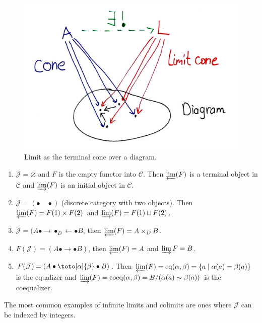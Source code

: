 \documentclass[english,letterpaper]{article}%
\numberwithin{equation}{section}
\numberwithin{figure}{section}
\numberwithin{table}{section}
\theoremstyle{definition}
\theoremstyle{definition}
\theoremstyle{definition}
\theoremstyle{plain}
\theoremstyle{plain}
\theoremstyle{plain}
\theoremstyle{plain}
\theoremstyle{remark}
\theoremstyle{remark}
\newcommand{\calC}{\mathcal{C}}
\newcommand{\calJ}{\mathcal{J}}
\newcommand{\colimit}{\varinjlim}
\newcommand{\limit}{\varprojlim}
\begin{document}
\begin{figure}[b]
    \centering
    \includegraphics[scale=0.15]{Images/limits.png}
    \caption{Limit as the terminal cone over a diagram.}
    \label{fig:limits}
\end{figure}
    
\begin{example}
\begin{enumerate}
    \item $\calJ=\varnothing$ and $F$ is the empty functor into $\calC$. Then $\limit(F)$ is a terminal object in $\calC$ and $\colimit(F)$ is an initial object in $\calC$.
    \item $\calJ=(\bullet\quad\bullet)$ (discrete category with two objects). Then $\limit(F)=F(1)\times F(2)$ and $\colimit(F)=F(1)\sqcup F(2)$.
    \item $\calJ=(A\bullet\to \bullet_D\longleftarrow \bullet B$, then $\limit(F)=A\times_D B$.
    \item $F(\calJ)=(A\bullet\to \bullet B)$, then $\limit(F)=A$ and $\colimit{F}=B$.
    \item $F(\calJ)=(A\bullet\toto[\alpha]{\beta}\bullet B)$. Then $\limit(F)=\mathrm{eq}(\alpha,\beta)=\{a\mid \alpha(a)=\beta(a)\}$ is the equalizer and $\colimit(F)=\mathrm{coeq}(\alpha,\beta)=B/(\alpha(a)\sim \beta(a))$ is the coequalizer.

\end{enumerate}
\end{example} 

The most common examples of infinite limits and colimits are ones where $\mathcal{J}$ can be indexed by integers.
\end{document}
